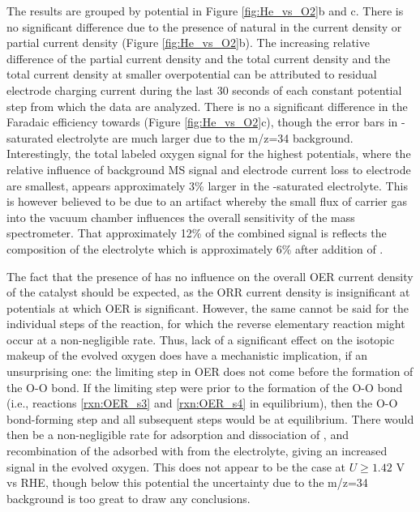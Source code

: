The results are grouped by potential in Figure \ref{fig:He_vs_O2}b and c. There is no significant difference due to the presence of natural  in the current density or  partial current density (Figure \ref{fig:He_vs_O2}b). The increasing relative difference of the  partial current density and the total current density and the total current density at smaller overpotential can be attributed to residual electrode charging current during the last 30 seconds of each constant potential step from which the data are analyzed. There is no a significant difference in the Faradaic efficiency towards  (Figure \ref{fig:He_vs_O2}c), though the error bars in -saturated electrolyte are much larger due to the m/z=34 background. Interestingly, the total labeled oxygen signal for the highest potentials, where the relative influence of background MS signal and electrode current loss to electrode are smallest, appears approximately 3\% larger in the -saturated electrolyte. This is however believed to be due to an artifact whereby the small flux of  carrier gas into the vacuum chamber influences the overall sensitivity of the mass spectrometer. That approximately 12\% of the combined  signal is  reflects the composition of the electrolyte which is approximately 6\%  after addition of .

The fact that the presence of  has no influence on the overall OER current density of the catalyst should be expected, as the ORR current density is insignificant at potentials at which OER is significant. However, the same cannot be said for the individual steps of the reaction, for which the reverse elementary reaction might occur at a non-negligible rate. Thus, lack of a significant effect on the isotopic makeup of the evolved oxygen does have a mechanistic implication, if an unsurprising one: the limiting step in OER does not come before the formation of the O-O bond. If the limiting step were prior to the formation of the O-O bond (i.e., reactions \ref{rxn:OER_s3} and \ref{rxn:OER_s4} in equilibrium), then the O-O bond-forming step and all subsequent steps would be at equilibrium. There would then be a non-negligible rate for adsorption and dissociation of , and recombination of the adsorbed  with  from the electrolyte, giving an increased  signal in the evolved oxygen. This does not appear to be the case at $U\ge1.42$ V vs RHE, though below this potential the uncertainty due to the m/z=34 background is too great to draw any conclusions. 

